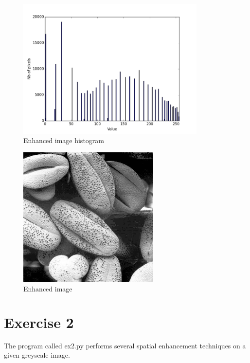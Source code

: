 \documentclass[10pt]{article}
\begin{document}
\begin{figure}[!ht]
	\centering
	\includegraphics[height=200pt]{./ex1/Fig2_enh_hist.png}
	\caption{Enhanced image histogram}
\end{figure}
\begin{figure}[!ht]
	\centering
	\includegraphics[height=200pt]{./ex1/Fig2_enh.jpg}
	\caption{Enhanced image}
\end{figure}
\clearpage

\section{Exercise 2}
The program called ex2.py performs several spatial enhancement techniques on a given greyscale image.
\end{document}
